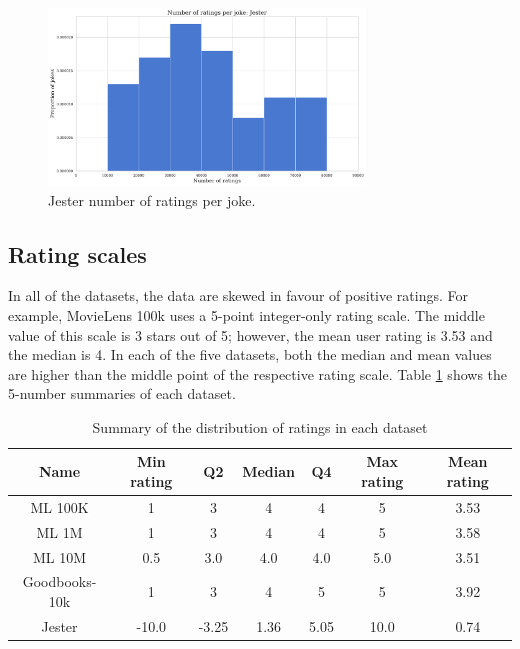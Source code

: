 \begin{figure}[H]
\centering
\includegraphics[width=0.75\textwidth]{Figures/3_ratings-distributions/jester_joke-ratings.pdf}
\caption{Jester number of ratings per joke.}
\label{fig:jester-items}
\end{figure}

\subsection{Rating scales}
In all of the datasets, the data are skewed in favour of positive ratings. For example, MovieLens 100k uses a 5-point integer-only rating scale. The middle value of this scale is 3 stars out of 5; however, the mean user rating is 3.53 and the median is 4. In each of the five datasets, both the median and mean values are higher than the middle point of the respective rating scale. Table \ref{tab:ratings-5-number-summaries} shows the 5-number summaries of each dataset.

\begin{table}[H]
\centering
\begin{tabular}{c | c | c | c | c | c | c}
\toprule
\textbf{Name} & \textbf{Min rating} & \textbf{Q2} & \textbf{Median} & \textbf{Q4} & \textbf{Max rating} & \textbf{Mean rating} \\
\midrule
ML 100K & 1 & 3 & 4 & 4 & 5 & 3.53 \\
ML 1M & 1 & 3 & 4 & 4 & 5 & 3.58 \\
ML 10M & 0.5 & 3.0 & 4.0 & 4.0 & 5.0 & 3.51 \\
Goodbooks-10k & 1 & 3 & 4 & 5 & 5 & 3.92 \\
Jester & -10.0 & -3.25 & 1.36 & 5.05 & 10.0 & 0.74 \\
\bottomrule
\end{tabular}
\caption[5-number of summaries of ratings]{Summary of the distribution of ratings in each dataset}
\label{tab:ratings-5-number-summaries}
\end{table}

